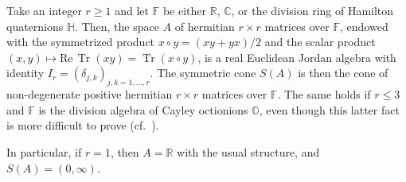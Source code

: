 \documentclass[10.5pt,reqno]{amsart}
\DeclareMathOperator{\tr}{Tr}
\newcommand{\C}{\mathds{C}}
\newcommand{\Hd}{\mathds{H}}
\newcommand{\Od}{\mathds{O}}
\newcommand{\R}{\mathds{R}}
\newcommand{\F}{\mathds{F}}
\renewcommand{\Re}{\mathrm{Re}\,}
\newcommand{\meg}{\leqslant}
\newcommand{\Meg}{\geqslant}
\begin{document}
\begin{ex}\label{ex:1}
	Take an integer $r\Meg 1$ and let $\F$ be either $\R$, $\C$, or the division ring of Hamilton quaternions $\Hd$. Then, the space $A$ of hermitian $r\times r$ matrices over $\F$, endowed with the symmetrized product $x\circ y= (x y+y x)/2$ and the scalar product $(x,y)\mapsto \Re \tr(xy)=\tr (x\circ y)$,  is a real Euclidean  Jordan algebra with identity $I_r=(\delta_{j,k})_{j,k=1,\dots, r}$. 
	The symmetric cone $S(A)$ is then the cone of non-degenerate positive hermitian $r\times r$ matrices over $\F$.
	The same holds if $r\meg 3$ and $\F$ is the division algebra of Cayley octionions $\Od$, even though this latter fact is more difficult to prove (cf.~\cite[Corollary V.2.6]{FarautKoranyi}).
	
	In particular, if $r=1$, then $A=\R$ with the usual structure, and $S(A)=(0,\infty)$.
\end{ex}
\end{document}
